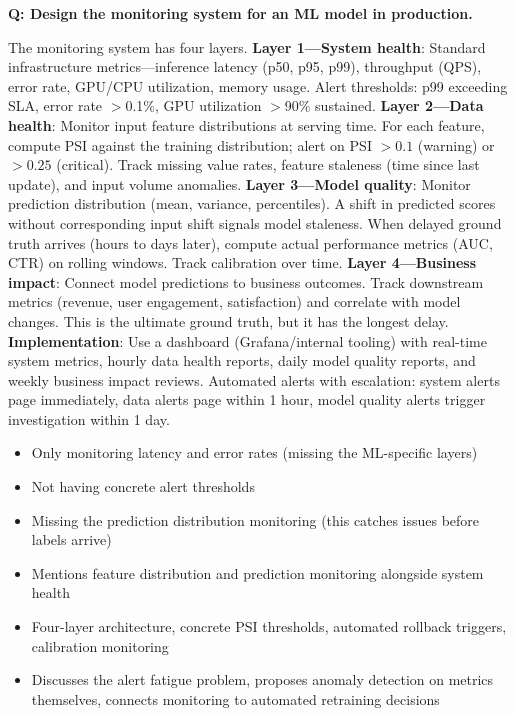 \begin{interviewq}
\textbf{Q: Design the monitoring system for an ML model in production.}

 \quad {} \quad \badgefreq{\freqmed}

\stronganswer The monitoring system has four layers. \textbf{Layer 1---System health}: Standard infrastructure metrics---inference latency (p50, p95, p99), throughput (QPS), error rate, GPU/CPU utilization, memory usage. Alert thresholds: p99 exceeding SLA, error rate $>$0.1\%, GPU utilization $>$90\% sustained. \textbf{Layer 2---Data health}: Monitor input feature distributions at serving time. For each feature, compute PSI against the training distribution; alert on PSI $> 0.1$ (warning) or $> 0.25$ (critical). Track missing value rates, feature staleness (time since last update), and input volume anomalies. \textbf{Layer 3---Model quality}: Monitor prediction distribution (mean, variance, percentiles). A shift in predicted scores without corresponding input shift signals model staleness. When delayed ground truth arrives (hours to days later), compute actual performance metrics (AUC, CTR) on rolling windows. Track calibration over time. \textbf{Layer 4---Business impact}: Connect model predictions to business outcomes. Track downstream metrics (revenue, user engagement, satisfaction) and correlate with model changes. This is the ultimate ground truth, but it has the longest delay. \textbf{Implementation}: Use a dashboard (Grafana/internal tooling) with real-time system metrics, hourly data health reports, daily model quality reports, and weekly business impact reviews. Automated alerts with escalation: system alerts page immediately, data alerts page within 1 hour, model quality alerts trigger investigation within 1 day.

\redflags
\begin{itemize}
    \item Only monitoring latency and error rates (missing the ML-specific layers)
    \item Not having concrete alert thresholds
    \item Missing the prediction distribution monitoring (this catches issues before labels arrive)
\end{itemize}


\goodgreat
\begin{itemize}
    \item {} Mentions feature distribution and prediction monitoring alongside system health
    \item {} Four-layer architecture, concrete PSI thresholds, automated rollback triggers, calibration monitoring
    \item {} Discusses the alert fatigue problem, proposes anomaly detection on metrics themselves, connects monitoring to automated retraining decisions
\end{itemize}


\end{interviewq}
